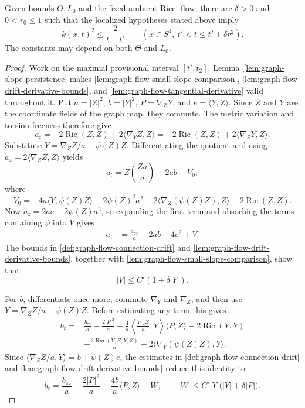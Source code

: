 \begin{theorem}
\label{thm:short-time-curve-curvature-barrier}
\notready
Given bounds $\Theta,L_0$ and the fixed ambient Ricci flow, there are
$\delta>0$ and $0<r_0\le1$ such that the localized hypotheses stated above
imply
\[
 k(x,t)^2\le\frac2{t-t'}
 \qquad(x\in S^1,\ t'<t\le t'+\delta r^2).
\]
The constants may depend on both $\Theta$ and $L_0$.
\end{theorem}
\begin{proof}
Work on the maximal provisional interval $[t',t_2]$.
Lemma~\ref{lem:graph-slope-persistence} makes
\ref{lem:graph-flow-small-slope-comparison},
\ref{lem:graph-flow-drift-derivative-bounds}, and
\ref{lem:graph-flow-tangential-derivative} valid throughout it.  Put
$a=|Z|^2$, $b=|Y|^2$, $P=\nabla_ZY$, and $e=\langle Y,Z\rangle$.  Since
$Z$ and $Y$ are the coordinate fields of the graph map, they commute.  The
metric variation and torsion-freeness therefore give
\[
 a_t=-2\operatorname{Ric}(Z,Z)+2\langle\nabla_YZ,Z\rangle
     =-2\operatorname{Ric}(Z,Z)+2\langle\nabla_ZY,Z\rangle.
\]
Substitute $Y=\nabla_ZZ/a-\psi(Z)Z$.  Differentiating the quotient and
using $a_z=2\langle\nabla_ZZ,Z\rangle$ yields
\[
 a_t=Z\left(\frac{Za}{a}\right)-2ab+V_0,
\]
where
\[
 V_0=-4a\langle Y,\psi(Z)Z\rangle-2\psi(Z)^2a^2
 -2\langle\nabla_Z(\psi(Z)Z),Z\rangle-2\operatorname{Ric}(Z,Z).
\]
Now $a_z=2ae+2\psi(Z)a^2$, so expanding the first term and absorbing the
terms containing $\psi$ into $V$ gives
\begin{align*}
 a_t&=\frac{a_{zz}}a-2ab-4e^2+V.                    \tag{1}
\end{align*}
The bounds in \ref{def:graph-flow-connection-drift} and
\ref{lem:graph-flow-drift-derivative-bounds}, together with
\ref{lem:graph-flow-small-slope-comparison}, show that
\[
 |V|\le C'(1+\delta|Y|).                            \tag{2}
\]

For $b$, differentiate once more, commute $\nabla_Y$ and $\nabla_Z$, and
then use $Y=\nabla_ZZ/a-\psi(Z)Z$.  Before estimating any term this gives
\begin{align*}
 b_t={}&\frac{b_{zz}}a-\frac{2|P|^2}a
 -\frac4a\left\langle\frac{\nabla_ZZ}{a},Y\right\rangle
             \langle P,Z\rangle
 -2\operatorname{Ric}(Y,Y)\\
 &+\frac{2\operatorname{Rm}(Y,Z,Y,Z)}a
 -2\langle\nabla_Y(\psi(Z)Z),Y\rangle.
\end{align*}
Since
$\langle\nabla_ZZ/a,Y\rangle=b+\psi(Z)e$, the estimates in
\ref{def:graph-flow-connection-drift} and
\ref{lem:graph-flow-drift-derivative-bounds} reduce this identity to
\[
 b_t=\frac{b_{zz}}a-\frac{2|P|^2}a
       -\frac{4b}{a}\langle P,Z\rangle+W,
 \qquad
 |W|\le C'|Y|\bigl(|Y|+\delta|P|\bigr).             \tag{3}
\]


\end{proof}
